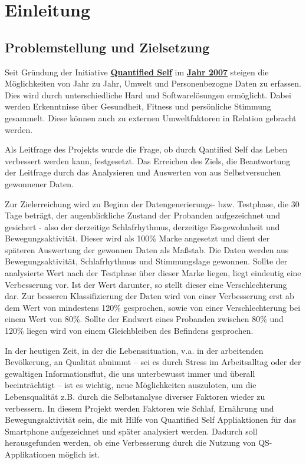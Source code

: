 
\chapter{Einleitung}
\label{ch:Einleitung}

\section{Problemstellung und Zielsetzung}
\label{problemstellung-und-zielsetzung}

Seit Gründung der Initiative
\href{http://quantifiedself.com/}{\textbf{Quantified Self}} im
\href{http://quantifiedself.com/2011/03/what-is-the-quantified-self/}{\textbf{Jahr
2007}} steigen die Möglichkeiten von Jahr zu Jahr, Umwelt und
Personenbezogne Daten zu erfassen. 
Dies wird durch unterschiedliche Hard
und Softwarelösungen ermöglicht. 
Dabei werden Erkenntnisse über
Gesundheit, Fitness und persönliche Stimmung gesammelt. 
Diese können
auch zu externen Umweltfaktoren in Relation gebracht werden.

Als Leitfrage des Projekts wurde die Frage, ob durch Qantified Self das Leben verbessert werden kann, festgesetzt. Das Erreichen des Ziels, die Beantwortung der Leitfrage durch das Analysieren und Auswerten von aus Selbstversuchen gewonnener Daten.

Zur Zielerreichung wird zu Beginn der Datengenerierungs- bzw. Testphase, die 30 Tage beträgt, der augenblickliche Zustand der Probanden aufgezeichnet und gesichert - also der derzeitige Schlafrhythmus, derzeitige Essgewohnheit und Bewegungsaktivität. Dieser wird als 100\% Marke angesetzt und dient der späteren Auswertung der gewonnen Daten als Maßstab. Die Daten werden aus Bewegungsaktivität, Schlafrhythmus und Stimmungslage gewonnen. Sollte der analysierte Wert nach der Testphase über dieser Marke liegen, liegt eindeutig eine Verbesserung vor. Ist der Wert darunter, so stellt dieser eine Verschlechterung dar. Zur besseren Klassifizierung der Daten wird von einer Verbesserung erst ab dem Wert von mindestens 120\% gesprochen, sowie von einer Verschlechterung bei einem Wert von 80\%. Sollte der Endwert eines Probanden zwischen 80\% und 120\% liegen wird von einem Gleichbleiben des Befindens gesprochen.

In der heutigen Zeit, in der die Lebenssituation, v.a. in der arbeitenden Bevölkerung, an Qualität abnimmt – sei es durch Stress im Arbeitsalltag oder der gewaltigen Informationsflut, die uns unterbewusst immer und überall beeinträchtigt – ist es wichtig, neue Möglichkeiten auszuloten, um die Lebensqualität z.B. durch die Selbstanalyse diverser Faktoren wieder zu verbessern. In diesem Projekt werden Faktoren wie Schlaf, Ernährung und Bewegungsaktivität sein, die mit Hilfe von Quantified Self Appliaktionen für das Smartphone aufgezeichnet und später analysiert werden. Dadurch soll herausgefunden werden, ob eine Verbesserung durch die Nutzung von QS-Applikationen möglich ist.

